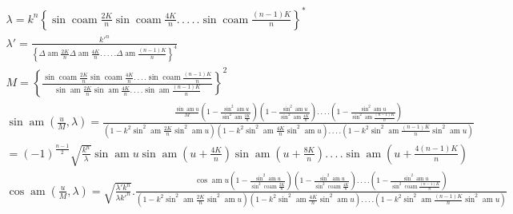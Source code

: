 \documentclass{article}
\begin{document}
\[
\begin{gathered}
\lambda=k^{n}\left\{\sin\operatorname{coam}\frac{2K}{n}\sin\operatorname{coam}\frac{4K}{n}.\,.\,.\,.\,.\sin\operatorname{coam}\frac{(n-1)K}{n}\right\}^{*}\\[2ex]
\lambda'=\frac{k'^{n}}{\left\{\Delta\operatorname{am}\frac{2K}{n}\Delta\operatorname{am}\frac{4K}{n}.\,.\,.\,.\,.\Delta\operatorname{am}\frac{(n-1)K}{n}\right\}^{4}}\\[2ex]
M=\left\{\frac{\sin\operatorname{coam}\frac{2K}{n}\sin\operatorname{coam}\frac{4K}{n}.\,.\,.\,.\sin\operatorname{coam}\frac{(n-1)K}{n}}{\sin\operatorname{am}\frac{2K}{n}\sin\operatorname{am}\frac{4K}{n}.\,.\,.\,.\sin\operatorname{am}\frac{(n-1)K}{n}}\right\}^{2}\\[2.5ex]
\sin\operatorname{am}\left(\frac{u}{M},\lambda\right)=\frac{\frac{\sin\operatorname{am}u}{M}\left(1-\frac{\sin^{2}\operatorname{am}u}{\sin^{2}\operatorname{am}\frac{2K}{n}}\right)\left(1-\frac{\sin^{2}\operatorname{am}u}{\sin^{2}\operatorname{am}\frac{4K}{n}}\right).\,.\,.\,.\left(1-\frac{\sin^{2}\operatorname{am}u}{\sin^{2}\operatorname{am}\frac{(n-1)K}{n}}\right)}{\left(1-k^{2}\sin^{2}\operatorname{am}\frac{2K}{n}\sin^{2}\operatorname{am}u\right)\left(1-k^{2}\sin^{2}\operatorname{am}\frac{4K}{n}\sin^{2}\operatorname{am}u\right).\,.\,.\,.\left(1-k^{2}\sin^{2}\operatorname{am}\frac{(n-1)K}{n}\sin^{2}\operatorname{am}u\right)}\\[2.5ex]
=(-1)^{\frac{n-1}{2}}\sqrt{\frac{k^{n}}{\lambda}}\sin\operatorname{am}u\sin\operatorname{am}\left(u+\frac{4K}{n}\right)\sin\operatorname{am}\left(u+\frac{8K}{n}\right).\,.\,.\,.\sin\operatorname{am}\left(u+\frac{4(n-1)K}{n}\right)\\[2.5ex]
\cos\operatorname{am}\left(\frac{u}{M},\lambda\right)=\sqrt{\frac{\lambda'k^{n}}{\lambda k'^{n}}}.\frac{\cos\operatorname{am}u\left(1-\frac{\sin^{2}\operatorname{am}u}{\sin^{2}\operatorname{coam}\frac{2K}{n}}\right)\left(1-\frac{\sin^{2}\operatorname{am}u}{\sin^{2}\operatorname{coam}\frac{4K}{n}}\right).\,.\,.\,.\left(1-\frac{\sin^{2}\operatorname{am}u}{\sin^{2}\operatorname{coam}\frac{(n-1)K}{n}}\right)}{\left(1-k^{2}\sin^{2}\operatorname{am}\frac{2K}{n}\sin^{2}\operatorname{am}u\right)\left(1-k^{2}\sin^{2}\operatorname{am}\frac{4K}{n}\sin^{2}\operatorname{am}u\right).\,.\,.\,.\left(1-k^{2}\sin^{2}\operatorname{am}\frac{(n-1)K}{n}\sin^{2}\operatorname{am}u\right)}
\end{gathered}
\]
\end{document}
